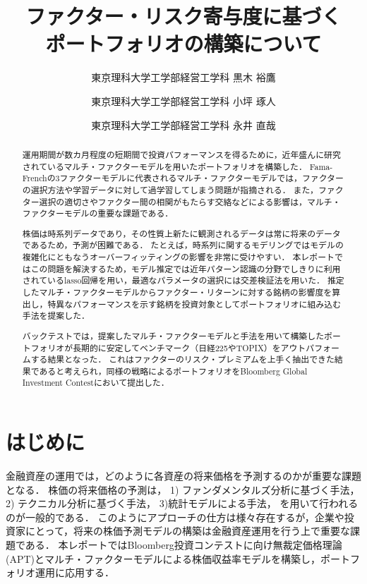 ﻿\documentclass[11pt]{jreport}
\begin{document}
\title{ファクター・リスク寄与度に基づく\\ポートフォリオの構築について\\}
\author{東京理科大学工学部経営工学科 \quad 黒木 裕鷹 \and 東京理科大学工学部経営工学科 \quad 小坪 琢人 \and 東京理科大学工学部経営工学科 \quad 永井 直哉}
\maketitle
{}
\tableofcontents



\begin{abstract}

運用期間が数カ月程度の短期間で投資パフォーマンスを得るために，近年盛んに研究されているマルチ・ファクターモデルを用いたポートフォリオを構築した．
Fama-Frenchの3ファクターモデルに代表されるマルチ・ファクターモデルでは，ファクターの選択方法や学習データに対して過学習してしまう問題が指摘される．
また，ファクター選択の適切さやファクター間の相関がもたらす交絡などによる影響は，マルチ・ファクターモデルの重要な課題である．

株価は時系列データであり，その性質上新たに観測されるデータは常に将来のデータであるため，予測が困難である．
たとえば，時系列に関するモデリングではモデルの複雑化にともなうオーバーフィッティングの影響を非常に受けやすい．
本レポートではこの問題を解決するため，モデル推定では近年パターン認識の分野でしきりに利用されているlasso回帰を用い，最適なパラメータの選択には交差検証法を用いた．
推定したマルチ・ファクターモデルからファクター・リターンに対する銘柄の影響度を算出し，特異なパフォーマンスを示す銘柄を投資対象としてポートフォリオに組み込む手法を提案した．

バックテストでは，提案したマルチ・ファクターモデルと手法を用いて構築したポートフォリオが長期的に安定してベンチマーク（日経225やTOPIX）をアウトパフォームする結果となった． 
これはファクターのリスク・プレミアムを上手く抽出できた結果であると考えられ，同様の戦略によるポートフォリオをBloomberg Global Investment Contestにおいて提出した．
\end{abstract}








\chapter{はじめに}
金融資産の運用では，どのように各資産の将来価格を予測するのかが重要な課題となる．
株価の将来価格の予測は，
1) ファンダメンタルズ分析に基づく手法，
2) テクニカル分析に基づく手法，
3)統計モデルによる手法，
を用いて行われるのが一般的である．
このようにアプローチの仕方は様々存在するが，企業や投資家にとって，将来の株価予測モデルの構築は金融資産運用を行う上で重要な課題である．
本レポートではBloomberg投資コンテストに向け無裁定価格理論(APT)とマルチ・ファクターモデルによる株価収益率モデルを構築し，ポートフォリオ運用に応用する．
\end{document}
